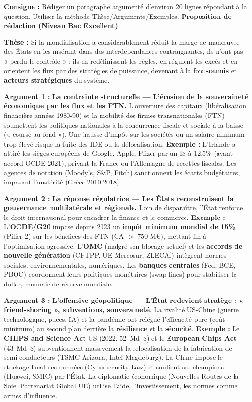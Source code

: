 \documentclass[11pt]{article}
\newcommand{\cle}[1]{{\popxbold\color{popdark}#1}}
\begin{document}
\begin{exoresolu}
    \textbf{Consigne :} Rédiger un paragraphe argumenté d'environ 20 lignes répondant à la question. Utiliser la méthode Thèse/Arguments/Exemples.
    \tcblower
    \textbf{Proposition de rédaction (Niveau Bac Excellent)}
    
    \textbf{Thèse :} Si la mondialisation a considérablement réduit la marge de manœuvre des États en les insérant dans des interdépendances contraignantes, ils n'ont pas « perdu le contrôle » : ils en redéfinissent les règles, en régulent les excès et en orientent les flux par des stratégies de puissance, devenant à la fois \textbf{soumis} et \textbf{acteurs stratégiques} du système.
    
    \textbf{Argument 1 : La contrainte structurelle — L'érosion de la souveraineté économique par les flux et les FTN.}
    L'ouverture des capitaux (libéralisation financière années 1980-90) et la mobilité des firmes transnationales (FTN) soumettent les politiques nationales à la \cle{concurrence fiscale et sociale} à la baisse (« course au fond »). Une hausse d'impôt sur les sociétés ou un salaire minimum trop élevé risque la fuite des IDE ou la délocalisation. \textbf{Exemple :} L'Irlande a attiré les sièges européens de Google, Apple, Pfizer par un IS à 12,5\% (avant accord OCDE 2021), privant la France ou l'Allemagne de recettes fiscales. Les agences de notation (Moody's, S\&P, Fitch) sanctionnent les écarts budgétaires, imposant l'austérité (Grèce 2010-2018).
    
    \textbf{Argument 2 : La réponse régulatrice — Les États reconstruisent la gouvernance multilatérale et régionale.}
    Loin de disparaître, l'État renforce le droit international pour encadrer la finance et le commerce. \textbf{Exemple :} L'\textbf{OCDE/G20} impose depuis 2023 un \textbf{impôt minimum mondial de 15\%} (Pilier 2) sur les bénéfices des FTN (CA $>$ 750 M€), mettant fin à l'optimisation agressive. L'\textbf{OMC} (malgré son blocage actuel) et les \textbf{accords de nouvelle génération} (CPTPP, UE-Mercosur, ZLECAf) intègrent normes sociales, environnementales, numériques. Les \textbf{banques centrales} (Fed, BCE, PBOC) coordonnent leurs politiques monétaires (swap lines) pour stabiliser le dollar, monnaie de réserve mondiale.
    
    \textbf{Argument 3 : L'offensive géopolitique — L'État redevient stratège : « friend-shoring », subventions, souveraineté.}
    La rivalité US-Chine (guerre technologique, puces, IA) et la pandémie ont relégué l'efficacité pure (coût minimum) au second plan derrière la \textbf{résilience} et la \textbf{sécurité}. \textbf{Exemple :} Le \textbf{CHIPS and Science Act} US (2022, \SI{52}{Md\$}) et le \textbf{European Chips Act} (\SI{43}{Md\$}) subventionnent massivement la relocalisation de la fabrication de semi-conducteurs (TSMC Arizona, Intel Magdeburg). La Chine impose le stockage local des données (Cybersecurity Law) et soutient ses champions (Huawei, SMIC) par l'État. La \cle{diplomatie économique} (Nouvelles Routes de la Soie, Partenariat Global UE) utilise l'aide, l'investissement, les normes comme armes d'influence.
    

\end{exoresolu}
\end{document}
